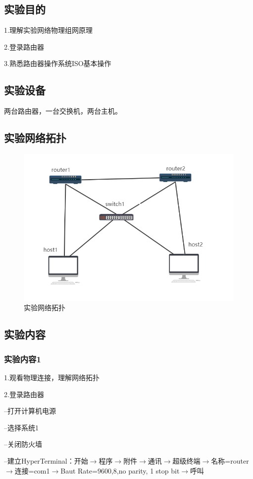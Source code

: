 \documentclass[lang=cn,11pt,a4paper,cite=authoryear]{elegantpaper}
\begin{document}
\subsection{实验目的}
1.理解实验网络物理组网原理

2.登录路由器

3.熟悉路由器操作系统ISO基本操作

\subsection{实验设备}
两台路由器，一台交换机，两台主机。

\subsection{实验网络拓扑}

\begin{figure}[htbp]
	\centering
	\includegraphics[width=0.7\linewidth]{image/screenshot004}
	\caption{实验网络拓扑}
	\label{fig:screenshot004}
\end{figure}

\subsection{实验内容}
\subsubsection{实验内容1}
1.观看物理连接，理解网络拓扑

2.登录路由器

--打开计算机电源

--选择系统1

--关闭防火墙

--建立HyperTerminal：开始$\rightarrow$程序$\rightarrow$附件$\rightarrow$通讯$\rightarrow$超级终端$\rightarrow$名称=router$\rightarrow$连接=com1$\rightarrow$Baut Rate=9600,8,no parity, 1 stop bit$\rightarrow$呼叫
\end{document}

